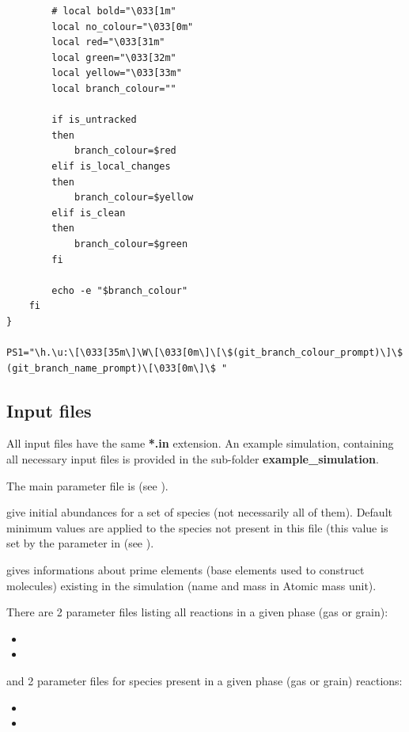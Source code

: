 \documentclass[english,a4paper,twoside]{article}
\begin{document}
\begin{verbatim}
        # local bold="\033[1m"
        local no_colour="\033[0m"
        local red="\033[31m"
        local green="\033[32m"
        local yellow="\033[33m"
        local branch_colour=""

        if is_untracked
        then
            branch_colour=$red
        elif is_local_changes
        then
            branch_colour=$yellow
        elif is_clean
        then
            branch_colour=$green
        fi

        echo -e "$branch_colour"
    fi
}

PS1="\h.\u:\[\033[35m\]\W\[\033[0m\]\[\$(git_branch_colour_prompt)\]\$
(git_branch_name_prompt)\[\033[0m\]\$ "
\end{verbatim}

\subsection{Input files}
All input files have the same \textbf{*.in} extension. An example simulation, containing all necessary input files is provided in the sub-folder \textbf{example\_simulation}.

The main parameter file is  (see ).

 give initial abundances for a set of species (not necessarily all of them). Default minimum values are applied to the species not present in this file (this value is set by the parameter  in  (see ).

 gives informations about prime elements (base elements used to construct molecules) existing in the simulation (name and mass in Atomic mass unit).

There are 2 parameter files listing all reactions in a given phase (gas or grain): 
\begin{itemize}
\item {}
\item {}
\end{itemize}
and 2 parameter files for species present in a given phase (gas or grain) reactions:
\begin{itemize}
\item {}
\item {}
\end{itemize}
\end{document}
